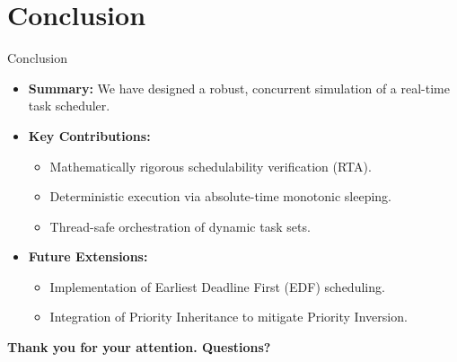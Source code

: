 \section{Conclusion}
\begin{frame}{Conclusion}
    \begin{itemize}
        \item \textbf{Summary:} We have designed a robust, concurrent simulation of a real-time task scheduler.
        \item \textbf{Key Contributions:}
        \begin{itemize}
            \item Mathematically rigorous schedulability verification (RTA).
            \item Deterministic execution via absolute-time monotonic sleeping.
            \item Thread-safe orchestration of dynamic task sets.
        \end{itemize}
        \item \textbf{Future Extensions:}
        \begin{itemize}
            \item Implementation of Earliest Deadline First (EDF) scheduling.
            \item Integration of Priority Inheritance to mitigate Priority Inversion.
        \end{itemize}
    \end{itemize}
    \vspace{0.5cm}
    \centering
    \textbf{\Large Thank you for your attention. Questions?}
\end{frame}